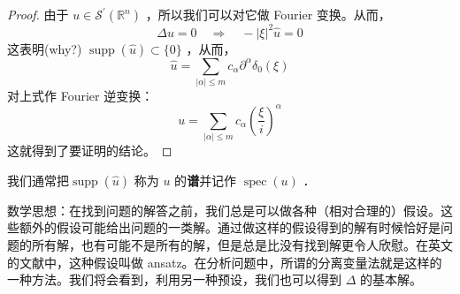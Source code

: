 \documentclass{mynote}
\begin{document}
\begin{proof}
    由于 $u \in \mathcal{S}^{\prime}\left(\mathbb{R}^n\right)$ ，所以我们可以对它做 Fourier 变换。从而，
$$
\Delta u=0 \quad \Rightarrow \quad-|\xi|^2 \widehat{u}=0
$$
这表明(why?) $\operatorname{supp}(\widehat{u}) \subset\{0\}$ ，从而，
$$
\widehat{u}=\sum_{|\alpha| \leqslant m} c_\alpha \partial^\alpha \delta_0(\xi)
$$
对上式作 Fourier 逆变换：
$$
u=\sum_{|\alpha| \leqslant m} c_\alpha\left(\frac{\xi}{i}\right)^\alpha
$$
这就得到了要证明的结论。
\end{proof}

\begin{remark}
    我们通常把$\operatorname{supp}(\widehat{u})$ 称为 $u$ 的\textbf{谱}并记作 $\operatorname{spec}(u)$ ．
\end{remark}


数学思想：在找到问题的解答之前，我们总是可以做各种（相对合理的）假设。这些额外的假设可能给出问题的一类解。通过做这样的假设得到的解有时候恰好是问题的所有解，也有可能不是所有的解，但是总是比没有找到解更令人欣慰。在英文的文献中，这种假设叫做 ansatz。在分析问题中，所谓的分离变量法就是这样的一种方法。我们将会看到，利用另一种预设，我们也可以得到 $\Delta$ 的基本解。
\end{document}

